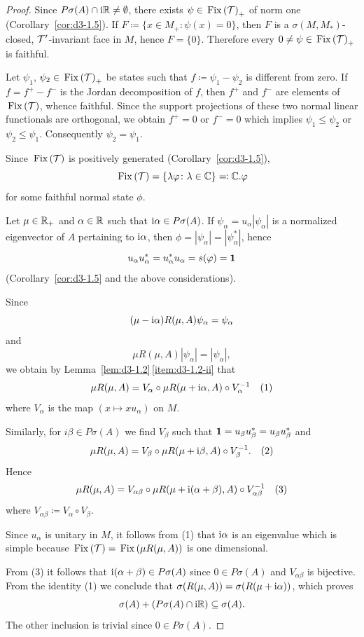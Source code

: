 \begin{proof}
Since $P\sigma(A) \cap \mathrm{i}\mathbb{R} \neq \emptyset$, there exists $\psi \in \mathop{}\mathrm{Fix}\left(\mathcal{T}\right)_{+}$ of norm one (Corollary~\ref{cor:d3-1.5}).
If\/ $F \coloneq \{x \in M_{+} \colon \psi(x) = 0\}$, then $F$ is a $\sigma(M,M_{*})$-closed, $\mathcal{T}'$-invariant face in $M$, hence $F = \{0\}$.
Therefore every $0 \neq \psi \in \mathop{}\mathrm{Fix}\left(\mathcal{T}\right)_{+}$ is faithful.

Let $\psi_{1}$, $\psi_{2} \in \mathop{}\mathrm{Fix}\left(\mathcal{T}\right)_{+}$ be states such that $f \coloneq \psi_{1} - \psi_{2}$ is different from zero. 
If\/ $f = f^{+} - f^{-}$ is the Jordan decomposition of\/ $f$, then $f^{+}$ and $f^{-}$ are elements of\/ $\mathop{}\mathrm{Fix}\left(\mathcal{T}\right)$, whence faithful.
Since the support projections of these two normal linear functionals are orthogonal, we obtain $f^{+} = 0$ or $f^{-} = 0$ which implies $\psi_{1} \leq \psi_{2}$ or $\psi_{2} \leq \psi_{1}$.
Consequently $\psi_{2} = \psi_{1}$.

Since $\mathop{}\mathrm{Fix}\left(\mathcal{T}\right)$ is positively generated (Corollary~\ref{cor:d3-1.5}), 
\[
\Fix{\TT} = \{ \lambda \phi \colon \lambda \in \C \} \eqcolon \C.\phi
\]
for some faithful normal state $\phi$.

Let $\mu \in \mathbb{R}_{+}$ and $\alpha \in \mathbb{R}$ such that $\mathrm{i}\alpha \in P\sigma(A)$.
If\/ $\psi_{\alpha} = u_{\alpha}|\psi_{\alpha}|$ is a normalized eigenvector of\/ $A$ pertaining to $\mathrm{i}\alpha$, then $\phi = |\psi_{\alpha}| = |\psi_{\alpha}^{*}|$, hence 
%
\[
	u_{\alpha}u_{\alpha}^{*} = u_{\alpha}^{*}u_{\alpha} = s(\phi) = \1
\]
%
(Corollary~\ref{cor:d3-1.5} and the above considerations).

Since
\[
(\mu - \mathrm{i}\alpha)R(\mu,A)\psi_{\alpha} = \psi_{\alpha}
\]
and
\[
\mu R(\mu,A)|\psi_{\alpha}| = |\psi_{\alpha}| ,
\]
we obtain by Lemma~\ref{lem:d3-1.2}\,\ref{item:d3-1.2-ii} that
\[
\mu R(\mu,A) = V_{\alpha} \circ \mu R(\mu+\mathrm{i}\alpha,A) \circ V_{\alpha}^{-1} \quad (1)
\]
where $V_{\alpha}$ is the map $(x \mapsto xu_{\alpha})$ on $M$.

Similarly, for $i\beta \in P\sigma(A)$ we find $V_{\beta}$ such that $\mathbf{1} = u_{\beta}u_{\beta}^{*} = u_{\beta}u_{\beta}^{*}$ and
\[
\mu R(\mu,A) = V_{\beta} \circ \mu R(\mu+ \mathrm{i} \beta,A) \circ V_{\beta}^{-1}. \quad (2) 
\]
Hence
\[
\mu R(\mu,A) = V_{\alpha\beta} \circ \mu R(\mu+ \mathrm{i} (\alpha+\beta),A) \circ V_{\alpha\beta}^{-1} \quad (3)
\]
where $V_{\alpha\beta} \coloneq V_{\alpha} \circ V_{\beta}$.

Since $u_{\alpha}$ is unitary in $M$, it follows from (1) that $\mathrm{i}\alpha$ is an eigenvalue which is simple because $\mathop{}\mathrm{Fix}\left(\mathcal{T}\right) = \mathop{}\mathrm{Fix}\left(\mu R(\mu,A)\right)$ is one dimensional.

From (3) it follows that $\mathrm{i}(\alpha+\beta) \in P\sigma(A)$ since $0 \in P\sigma(A)$ and $V_{\alpha\beta}$ is bijective.
From the identity (1) we conclude that $\sigma(R(\mu,A)) = \sigma(R(\mu+\mathrm{i}\alpha))$, which proves
\[
\sigma(A) + (P\sigma(A) \cap \mathrm{i}\mathbb{R}) \subseteq \sigma(A).
\]
The other inclusion is trivial since $0 \in P\sigma(A)$.
\end{proof}
